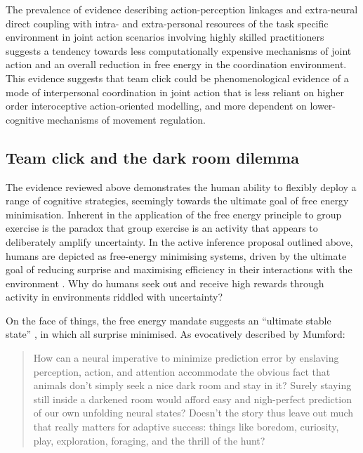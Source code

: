 \begin{CJK}{UTF8}{gbsn}
The prevalence of evidence describing action-perception linkages and extra-neural direct coupling with intra- and extra-personal resources of the task specific environment in joint action scenarios involving highly skilled practitioners suggests a tendency towards less computationally expensive mechanisms of joint action and an overall reduction in free energy in the coordination environment.  This evidence suggests that team click could be phenomenological evidence of a mode of interpersonal coordination in joint action that is less reliant on higher order interoceptive action-oriented modelling, and more dependent on lower-cognitive mechanisms of movement regulation.



\subsection{Team click and the dark room dilemma}

The evidence reviewed above demonstrates the human ability to flexibly deploy a range of cognitive strategies, seemingly towards the ultimate goal of free energy minimisation.  Inherent in the application of the free energy principle to group exercise is the paradox that group exercise is an activity that appears to deliberately amplify uncertainty.  In the active inference proposal outlined above, humans are depicted as free-energy minimising systems, driven by the ultimate goal of reducing surprise and maximising efficiency in their interactions with the environment \citep{Friston2010}.  Why do humans seek out and receive high rewards through activity in environments riddled with uncertainty?

On the face of things, the free energy mandate suggests an ``ultimate stable state'' \citep{Mumford1992}, in which all surprise minimised.  As evocatively described by Mumford:

\begin{quote}
  How can a neural imperative to minimize prediction error by enslaving perception, action, and attention accommodate the obvious fact that animals don’t simply seek a nice dark room and stay in it? Surely staying still inside a darkened room would afford easy and nigh-perfect prediction of our own unfolding neural states? Doesn’t the story thus leave out much that really matters for adaptive success: things like boredom, curiosity, play, exploration, foraging, and the thrill of the hunt? \citep[243]{Mumford1992}
\end{quote}


\end{CJK}
